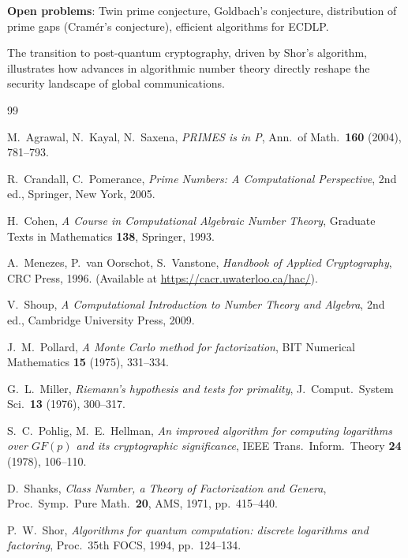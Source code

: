 \documentclass[12pt,a4paper]{amsart}
\theoremstyle{definition}
\begin{document}
\medskip
\noindent\textbf{Open problems}:
Twin prime conjecture, Goldbach's conjecture, distribution of prime gaps
(Cramér's conjecture), efficient algorithms for ECDLP.

The transition to post-quantum cryptography, driven by Shor's algorithm,
illustrates how advances in algorithmic number theory directly reshape
the security landscape of global communications.

\begin{thebibliography}{99}

M.~Agrawal, N.~Kayal, N.~Saxena,
\emph{PRIMES is in P},
Ann.\ of Math.\ \textbf{160} (2004), 781--793.

R.~Crandall, C.~Pomerance,
\emph{Prime Numbers: A Computational Perspective},
2nd ed., Springer, New York, 2005.

H.~Cohen,
\emph{A Course in Computational Algebraic Number Theory},
Graduate Texts in Mathematics \textbf{138}, Springer, 1993.

A.~Menezes, P.~van Oorschot, S.~Vanstone,
\emph{Handbook of Applied Cryptography},
CRC Press, 1996. (Available at \url{https://cacr.uwaterloo.ca/hac/}).

V.~Shoup,
\emph{A Computational Introduction to Number Theory and Algebra},
2nd ed., Cambridge University Press, 2009.

J.~M.~Pollard,
\emph{A Monte Carlo method for factorization},
BIT Numerical Mathematics \textbf{15} (1975), 331--334.

G.~L.~Miller,
\emph{Riemann's hypothesis and tests for primality},
J.~Comput.\ System Sci.\ \textbf{13} (1976), 300--317.

S.~C.~Pohlig, M.~E.~Hellman,
\emph{An improved algorithm for computing logarithms over $GF(p)$ and its cryptographic significance},
IEEE Trans.\ Inform.\ Theory \textbf{24} (1978), 106--110.

D.~Shanks,
\emph{Class Number, a Theory of Factorization and Genera},
Proc.\ Symp.\ Pure Math.\ \textbf{20}, AMS, 1971, pp.~415--440.

P.~W.~Shor,
\emph{Algorithms for quantum computation: discrete logarithms and factoring},
Proc.\ 35th FOCS, 1994, pp.~124--134.

\end{thebibliography}
\end{document}
